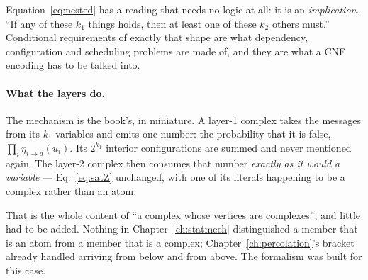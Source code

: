 Equation~\eqref{eq:nested} has a reading that needs no logic at all: it is an
\emph{implication}. ``If any of these $k_{1}$ things holds, then at least one of
these $k_{2}$ others must.'' Conditional requirements of exactly that shape are
what dependency, configuration and scheduling problems are made of, and they are
what a CNF encoding has to be talked into.

\paragraph{What the layers do.} The mechanism is the book's, in miniature. A
layer-1 complex takes the messages from its $k_{1}$ variables and emits one
number: the probability that it is false, $\prod_{i}\eta_{i\to a}(u_{i})$. Its
$2^{k_{1}}$ interior configurations are summed and never mentioned again. The
layer-2 complex then consumes that number \emph{exactly as it would a
variable} --- Eq.~\eqref{eq:satZ} unchanged, with one of its literals happening
to be a complex rather than an atom.

That is the whole content of ``a complex whose vertices are complexes'', and
little had to be added. Nothing in
Chapter~\ref{ch:statmech} distinguished a member that is an atom from a member
that is a complex; Chapter~\ref{ch:percolation}'s bracket already handled
arriving from below and from above. The formalism was built for this case.

